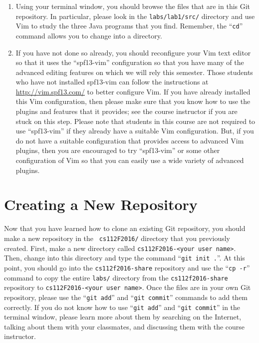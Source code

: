 \begin{enumerate}
\item Using your terminal window, you should browse the files that are in this Git repository.  In particular, please
  look in the {\tt labs/lab1/src/} directory and use Vim to study the three Java programs that you find.  Remember, the
  ``{\tt cd}'' command allows you to change into a directory.

\item If you have not done so already, you should reconfigure your Vim text editor so that it uses the ``spf13-vim''
  configuration so that you have many of the advanced editing features on which we will rely this semester. Those
  students who have not installed spf13-vim can follow the instructions at \url{http://vim.spf13.com/} to better
  configure Vim. If you have already installed this Vim configuration, then please make sure that you know how to use
  the plugins and features that it provides; see the course instructor if you are stuck on this step. Please note that
  students in this course are not required to use ``spf13-vim'' if they already have a suitable Vim configuration.
  But, if you do not have a suitable configuration that provides access to advanced Vim plugins, then you are
  encouraged to try ``spf13-vim'' or some other configuration of Vim so that you can easily use a wide variety of
  advanced plugins.

\end{enumerate}

\vspace*{-.1in}

\section*{Creating a New Repository}

Now that you have learned how to clone an existing Git repository, you should make a new repository in the {\tt
  cs112F2016/} directory that you previously created.  First, make a new directory called {\tt cs112F2016-<your user
name>}. Then, change into this directory and type the command ``{\tt git init .}''.  At this point, you should go into
the {\tt cs112f2016-share} repository and use the ``{\tt cp -r}'' command to copy the entire {\tt labs/} directory from
the {\tt cs112f2016-share} repository to {\tt cs112F2016-<your user name>}.  Once the files are in your own Git
repository, please use the ``{\tt git add}'' and ``{\tt git commit}'' commands to add them correctly. If you do not know
how to use ``{\tt git add}'' and ``{\tt git commit}'' in the terminal window, please learn more about them by searching
on the Internet, talking about them with your classmates, and discussing them with the course instructor.

